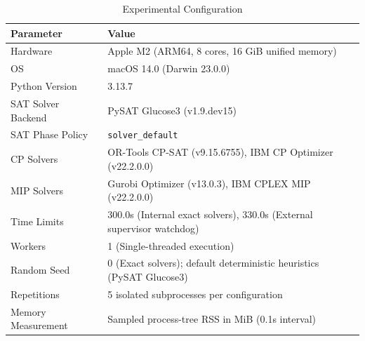 \begin{table}[h]
\centering
\caption{Experimental Configuration}
\begin{tabular}{@{}ll@{}}
\toprule
Parameter & Value \\
\midrule
Hardware & Apple M2 (ARM64, 8 cores, 16 GiB unified memory) \\
OS & macOS 14.0 (Darwin 23.0.0) \\
Python Version & 3.13.7 \\
SAT Solver Backend & PySAT Glucose3 (v1.9.dev15) \\
SAT Phase Policy & \texttt{solver\_default} \\
CP Solvers & OR-Tools CP-SAT (v9.15.6755), IBM CP Optimizer (v22.2.0.0) \\
MIP Solvers & Gurobi Optimizer (v13.0.3), IBM CPLEX MIP (v22.2.0.0) \\
Time Limits & 300.0s (Internal exact solvers), 330.0s (External supervisor watchdog) \\
Workers & 1 (Single-threaded execution) \\
Random Seed & 0 (Exact solvers); default deterministic heuristics (PySAT Glucose3) \\
Repetitions & 5 isolated subprocesses per configuration \\
Memory Measurement & Sampled process-tree RSS in MiB (0.1s interval) \\
\bottomrule
\end{tabular}
\label{tab:config}
\end{table}
